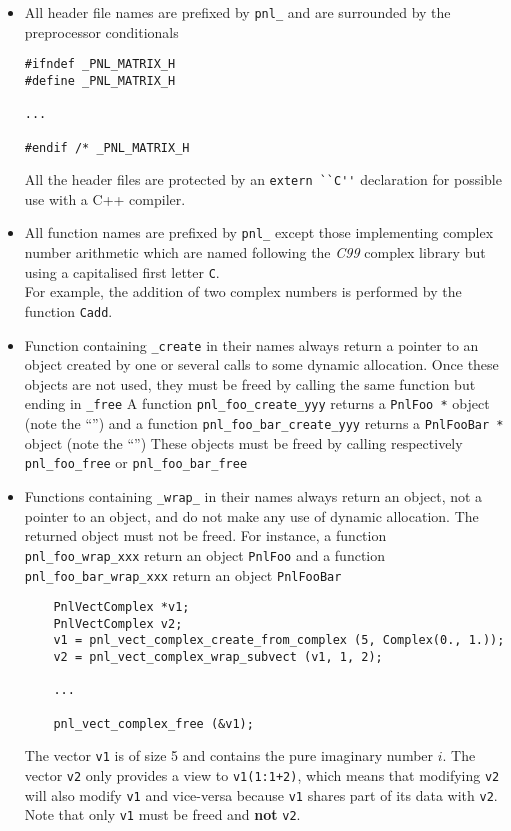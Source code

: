 \documentclass[a4paper,11pt,twoside]{article}
\newcommand{\ptr}{\textasteriskcentered}
\begin{document}
\begin{itemize}
  \item All header file names are prefixed by \verb!pnl_! and are surrounded by
    the preprocessor conditionals
\begin{verbatim}
#ifndef _PNL_MATRIX_H
#define _PNL_MATRIX_H

...

#endif /* _PNL_MATRIX_H
\end{verbatim}
All the header files are protected by an \verb!extern ``C''! declaration for
possible use with a C++ compiler.

  \item All function names are prefixed by \verb!pnl_! except those implementing
    complex number arithmetic which are named following the \textit{C99}
    complex library but using a capitalised first letter \verb!C!. \\
    For example, the addition of two complex numbers is performed by the
    function \verb!Cadd!.

  \item Function containing \verb!_create! in their names always return a
    pointer to an object created by one or several calls to some dynamic
    allocation. Once these objects are not used, they must be freed by calling
    the same function but ending in \verb!_free!
    A function \verb!pnl_foo_create_yyy! returns a \verb!PnlFoo *! object (note
    the ``\ptr'') and a function \verb!pnl_foo_bar_create_yyy! returns a
    \verb!PnlFooBar *! object (note the ``\ptr'')
    These objects must be freed by calling respectively \verb!pnl_foo_free! or
    \verb!pnl_foo_bar_free!

  \item Functions containing \verb!_wrap_! in their names always return an
    object, not a pointer to an object, and do not make any use of dynamic
    allocation. The returned object must not be freed. 
    For instance, a function \verb!pnl_foo_wrap_xxx! return an object
    \verb!PnlFoo! and a function \verb!pnl_foo_bar_wrap_xxx! return an object
    \verb!PnlFooBar! 
    \begin{verbatim}
    PnlVectComplex *v1;
    PnlVectComplex v2;
    v1 = pnl_vect_complex_create_from_complex (5, Complex(0., 1.));
    v2 = pnl_vect_complex_wrap_subvect (v1, 1, 2);

    ...

    pnl_vect_complex_free (&v1);
    \end{verbatim}
    The vector \verb!v1! is of size 5 and contains the pure imaginary number
    $i$. The vector \verb!v2! only provides a view to \verb!v1(1:1+2)!, which
    means that modifying \verb!v2! will also modify \verb!v1! and vice-versa
    because \verb!v1! shares part of its data with \verb!v2!. Note that only
    \verb!v1! must be freed and {\bf not} \verb!v2!.
  

\end{itemize}
\end{document}
